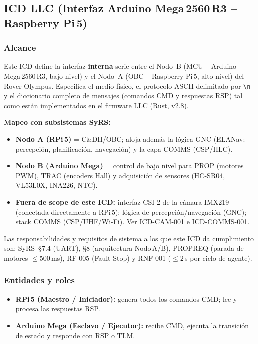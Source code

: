 
\subsection{ICD LLC (Interfaz Arduino Mega\,2560\,R3 -- Raspberry Pi\,5)}
\label{sec:icd_llc}

\subsubsection{Alcance}
Este ICD define la interfaz \textbf{interna} serie entre el Nodo~B
(MCU -- Arduino Mega\,2560\,R3, bajo nivel) y el Nodo~A
(OBC -- Raspberry Pi\,5, alto nivel) del Rover Olympus.
Especifica el medio físico, el protocolo ASCII delimitado por
\verb|\n| y el diccionario completo de mensajes
(comandos CMD y respuestas RSP) tal como están implementados
en el firmware LLC (Rust, v2.8).

\textbf{Mapeo con subsistemas SyRS:}
\begin{itemize}
  \item \textbf{Nodo A (RPi\,5)} = C\&DH/OBC; aloja además la lógica GNC
        (ELANav: percepción, planificación, navegación) y la capa COMMS (CSP/HLC).
  \item \textbf{Nodo B (Arduino Mega)} = control de bajo nivel para PROP
        (motores PWM), TRAC (encoders Hall) y adquisición de sensores
        (HC-SR04, VL53L0X, INA226, NTC).
  \item \textbf{Fuera de scope de este ICD:} interfaz CSI-2 de la cámara
        IMX219 (conectada directamente a RPi\,5); lógica de percepción/navegación
        (GNC); stack COMMS (CSP/UHF/Wi-Fi). Ver ICD-CAM-001 e ICD-COMMS-001.
\end{itemize}

Las responsabilidades y requisitos de sistema a los que este ICD da
cumplimiento son: SyRS~§7.4 (UART), §8 (arquitectura Nodo\,A/B),
PROP\-REQ (parada de motores $\leq 500$\,ms),
RF‑005 (Fault Stop) y RNF‑001 ($\leq 2$\,s por ciclo de agente).

\subsubsection{Entidades y roles}
\begin{itemize}
  \item \textbf{RPi\,5 (Maestro / Iniciador):}
        genera todos los comandos CMD; lee y procesa las respuestas RSP.
  \item \textbf{Arduino Mega (Esclavo / Ejecutor):}
        recibe CMD, ejecuta la transición de estado y responde
        con RSP o TLM.
\end{itemize}

